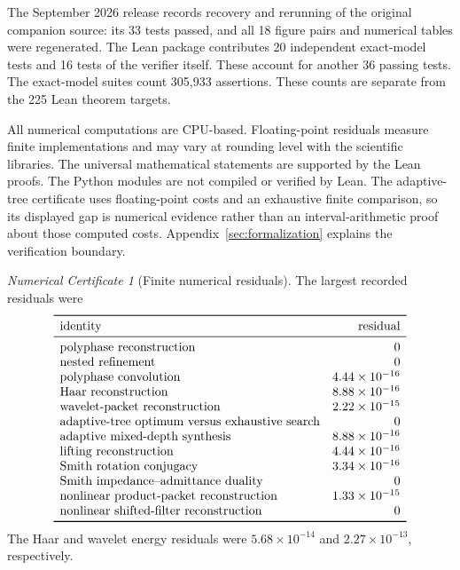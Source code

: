 \documentclass[11pt,letterpaper]{article}
\theoremstyle{plain}
\theoremstyle{plain}
\theoremstyle{plain}
\theoremstyle{definition}
\theoremstyle{definition}
\theoremstyle{definition}
\theoremstyle{definition}
\theoremstyle{remark}
\theoremstyle{remark}
\theoremstyle{remark}
\newtheorem{certificate}[certificate]{Numerical Certificate}
\theoremstyle{remark}
\begin{document}
The September 2026 release records recovery and rerunning of the original companion source: its 33 tests passed, and all 18 figure pairs and numerical tables were regenerated. The Lean package contributes 20 independent exact-model tests and 16 tests of the verifier itself. These account for another 36 passing tests. The exact-model suites count 305,933 assertions. These counts are separate from the 225 Lean theorem targets.

All numerical computations are CPU-based. Floating-point residuals measure finite implementations and may vary at rounding level with the scientific libraries. The universal mathematical statements are supported by the Lean proofs. The Python modules are not compiled or verified by Lean. The adaptive-tree certificate uses floating-point costs and an exhaustive finite comparison, so its displayed gap is numerical evidence rather than an interval-arithmetic proof about those computed costs. Appendix~\ref{sec:formalization} explains the verification boundary.

\begin{certificate}[Finite numerical residuals]\label{core:record:36}
The largest recorded residuals were
\[
\begin{array}{lr}
\toprule
\text{identity}&\text{residual}\\
\midrule
\text{polyphase reconstruction}&0\\
\text{nested refinement}&0\\
\text{polyphase convolution}&4.44\times10^{-16}\\
\text{Haar reconstruction}&8.88\times10^{-16}\\
\text{wavelet-packet reconstruction}&2.22\times10^{-15}\\
\text{adaptive-tree optimum versus exhaustive search}&0\\
\text{adaptive mixed-depth synthesis}&8.88\times10^{-16}\\
\text{lifting reconstruction}&4.44\times10^{-16}\\
\text{Smith rotation conjugacy}&3.34\times10^{-16}\\
\text{Smith impedance--admittance duality}&0\\
\text{nonlinear product-packet reconstruction}&1.33\times10^{-15}\\
\text{nonlinear shifted-filter reconstruction}&0\\
\bottomrule
\end{array}
\]
The Haar and wavelet energy residuals were $5.68\times10^{-14}$ and $2.27\times10^{-13}$, respectively.
\end{certificate}
\end{document}
